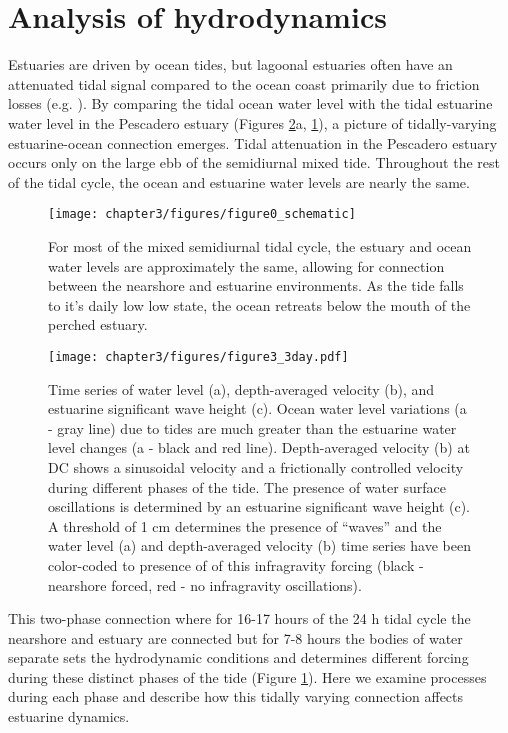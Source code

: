 \section{Analysis of hydrodynamics}

Estuaries are driven by ocean tides, but lagoonal estuaries often
have an attenuated tidal signal compared to the ocean coast primarily
due to friction losses (e.g. \cite{rydberg_tidal_1996}).
By comparing the tidal ocean water level with the tidal estuarine
water level in the Pescadero estuary (Figures \ref{f3_HUHse}a, \ref{f4_wl_schematic}),
a picture of tidally-varying estuarine-ocean connection emerges. Tidal
attenuation in the Pescadero estuary occurs only on the large ebb
of the semidiurnal mixed tide. Throughout the rest of the tidal cycle,
the ocean and estuarine water levels are nearly the same.


\begin{figure}
\centering
\texttt{[image: chapter3/figures/figure0\_schematic]}

\protect\caption{For most of the mixed semidiurnal tidal cycle, the estuary and ocean
water levels are approximately the same, allowing for connection between
the nearshore and estuarine environments. As the tide falls to it's
daily low low state, the ocean retreats below the mouth of the perched
estuary.\label{f4_wl_schematic}}
\end{figure}

\begin{figure}[tp]
\texttt{[image: chapter3/figures/figure3\_3day.pdf]}

\protect\caption{Time series of water level (a), depth-averaged velocity (b), and estuarine
significant wave height (c). Ocean water level variations (a - gray
line) due to tides are much greater than the estuarine water level
changes (a - black and red line). Depth-averaged velocity (b) at DC
shows a sinusoidal velocity and a frictionally controlled velocity
during different phases of the tide. The presence of water surface
oscillations is determined by an estuarine significant wave height
(c). A threshold of 1 cm determines the presence of ``waves'' and
the water level (a) and depth-averaged velocity (b) time series have
been color-coded to presence of of this infragravity forcing (black
- nearshore forced, red - no infragravity oscillations). \label{f3_HUHse}}
\end{figure}

This two-phase connection where for 16-17 hours of the 24 h tidal
cycle the nearshore and estuary are connected but for 7-8 hours the
bodies of water separate sets the hydrodynamic conditions and determines
different forcing during these distinct phases of the tide (Figure
\ref{f4_wl_schematic}). Here we examine processes during each phase
and describe how this tidally varying connection affects estuarine
dynamics. 


